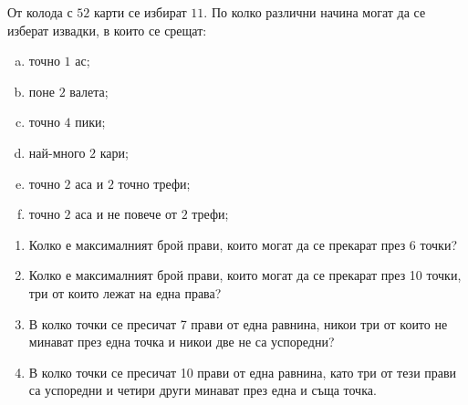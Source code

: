 \begin{problem}
  От колода с $52$ карти се избират $11$. По колко различни начина могат да се изберат извадки, в които се срещат:
  \begin{enumerate}[a)]
  \item
    точно $1$ ас;
  \item
    поне $2$ валета;
  \item
    точно $4$ пики;
  \item
    най-много $2$ кари;
  \item
    точно $2$ аса и $2$ точно трефи;
  \item
    точно $2$ аса и не повече от $2$ трефи;
  \end{enumerate}
\end{problem}

\begin{problem}
  \begin{enumerate}
  \item
    Колко е максималният брой прави, които могат да се прекарат през 6 точки?
  \item
    Колко е максималният брой прави, които могат да се прекарат през 10 точки, три от които лежат на една права? 
  \item
    В колко точки се пресичат 7 прави от една равнина, никои три от които не минават през една точка и никои две не са успоредни?
  \item
    В колко точки се пресичат 10 прави от една равнина, като три от тези прави са успоредни и четири други минават през една и съща точка.
\end{enumerate}
\end{problem}



